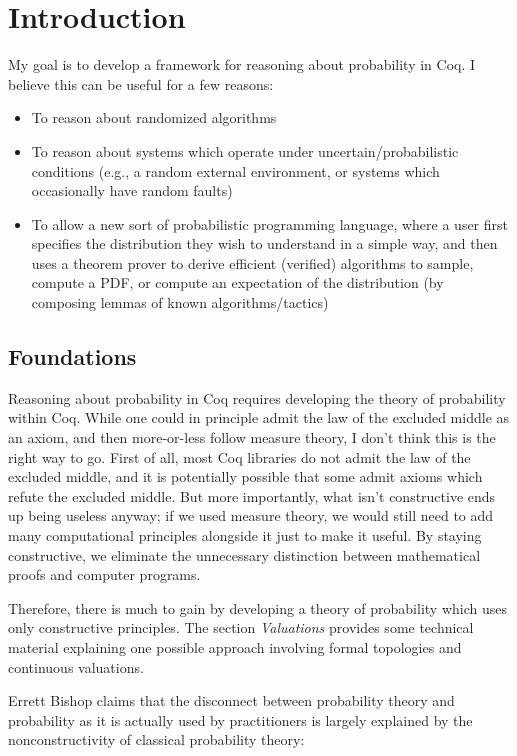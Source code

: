 \section{Introduction}

My goal is to develop a framework for reasoning about probability in Coq. I believe this can be useful for a few reasons:
\begin{itemize}
\item To reason about randomized algorithms
\item To reason about systems which operate under uncertain/probabilistic conditions (e.g., a random external environment, or systems which occasionally have random faults)
\item To allow a new sort of probabilistic programming language, where a user first specifies the distribution they wish to understand in a simple way, and then uses a theorem prover to derive efficient (verified) algorithms to sample, compute a PDF, or compute an expectation of the distribution (by composing lemmas of known algorithms/tactics)
\end{itemize}

\subsection{Foundations}

Reasoning about probability in Coq requires developing the theory of probability within Coq. While one could in principle admit the law of the excluded middle as an axiom, and then more-or-less follow measure theory, I don't think this is the right way to go. First of all, most Coq libraries do not admit the law of the excluded middle, and it is potentially possible that some admit axioms which refute the excluded middle. But more importantly, what isn't constructive ends up being useless anyway; if we used measure theory, we would still need to add many computational principles alongside it just to make it useful. By staying constructive, we eliminate the unnecessary distinction between mathematical proofs and computer programs.

Therefore, there is much to gain by developing a theory of probability which uses only constructive principles. The section \emph{Valuations} provides some technical material explaining one possible approach involving formal topologies and continuous valuations.

Errett Bishop claims that the disconnect between probability theory and probability as it is actually used by practitioners is largely explained by the nonconstructivity of classical probability theory\cite{bishop1973}:

